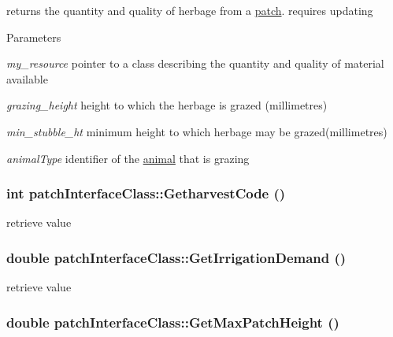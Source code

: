 returns the quantity and quality of herbage from a \hyperlink{classpatch}{patch}. requires updating 
\begin{DoxyParams}{Parameters}
\item[{\em my\_\-resource}]pointer to a class describing the quantity and quality of material available \item[{\em grazing\_\-height}]height to which the herbage is grazed (millimetres) \item[{\em min\_\-stubble\_\-ht}]minimum height to which herbage may be grazed(millimetres) \item[{\em animalType}]identifier of the \hyperlink{classanimal}{animal} that is grazing \end{DoxyParams}
\hypertarget{classpatch_interface_class_afced3ff48390bad8f8867247f36b6d0d}{
\subsubsection[{GetharvestCode}]{\setlength{\rightskip}{0pt plus 5cm}int patchInterfaceClass::GetharvestCode ()}}
\label{classpatch_interface_class_afced3ff48390bad8f8867247f36b6d0d}


retrieve value \hypertarget{classpatch_interface_class_ac1b0a6001b03d5d2868f997417ffb00e}{
\subsubsection[{GetIrrigationDemand}]{\setlength{\rightskip}{0pt plus 5cm}double patchInterfaceClass::GetIrrigationDemand ()}}
\label{classpatch_interface_class_ac1b0a6001b03d5d2868f997417ffb00e}


retrieve value \hypertarget{classpatch_interface_class_aaf06ccc28f2da0305c55612a1014a7a7}{
\subsubsection[{GetMaxPatchHeight}]{\setlength{\rightskip}{0pt plus 5cm}double patchInterfaceClass::GetMaxPatchHeight ()}}
\label{classpatch_interface_class_aaf06ccc28f2da0305c55612a1014a7a7}


